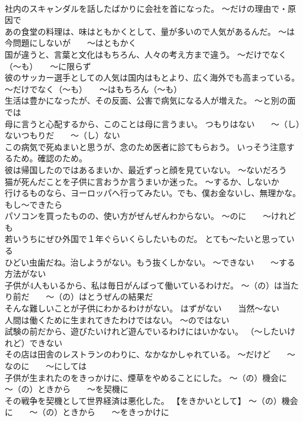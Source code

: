 \documentclass[8pt]{extreport}
\begin{document}
\begin{CJK}{UTF8}{min}
\\	社内のスキャンダルを話したばかりに会社を首になった。	～だけの理由で・原因で
\\	あの食堂の料理は、味はともかくとして、量が多いので人気があるんだ。	～は今問題にしないが　　～はともかく
\\	国が違うと、言葉と文化はもちろん、人々の考え方まで違う。	～だけでなく（～も）　　～に限らず
\\	彼のサッカー選手としての人気は国内はもとより、広く海外でも高まっている。	～だけでなく（～も）　　～はもちろん（～も）
\\	生活は豊かになったが、その反面、公害で病気になる人が増えた。	～と別の面では
\\	母に言うと心配するから、このことは母に言うまい。	つもりはない　　～（し）ないつもりだ　　～（し）ない
\\	この病気で死ぬまいと思うが、念のため医者に診てもらおう。	いっそう注意するため。確認のため。
\\	彼は帰国したのではあるまいか、最近ずっと顔を見ていない。	～ないだろう
\\	猫が死んだことを子供に言おうか言うまいか迷った。	～するか、しないか
\\	行けるものなら、ヨーロッパへ行ってみたい。でも、僕お金ないし、無理かな。	もし～できたら
\\	パソコンを買ったものの、使い方がぜんぜんわからない。	～のに　　～けれども
\\	若いうちにぜひ外国で１年ぐらいくらしたいものだ。	とても～たいと思っている
\\	ひどい虫歯だね。治しようがない。もう抜くしかない。	～できない　　～する方法がない
\\	子供が4人もいるから、私は毎日がんばって働いているわけだ。	～（の）は当たり前だ　　～（の）はとうぜんの結果だ
\\	そんな難しいことが子供にわかるわけがない。	はずがない　　当然～ない
\\	人間は働くために生まれてきたわけではない。	～のではない
\\	試験の前だから、遊びたいけれど遊んでいるわけにはいかない。	（～したいけれど）できない
\\	その店は田舎のレストランのわりに、なかなかしゃれている。	～だけど　　～なのに　　～にしては
\\	子供が生まれたのをきっかけに、煙草をやめることにした。	～（の）機会に　　～（の）ときから　　～を契機に
\\	その戦争を契機として世界経済は悪化した。	【をきかいとして】 ～（の）機会に　　～（の）ときから　　～をきっかけに

\end{CJK}
\end{document}
